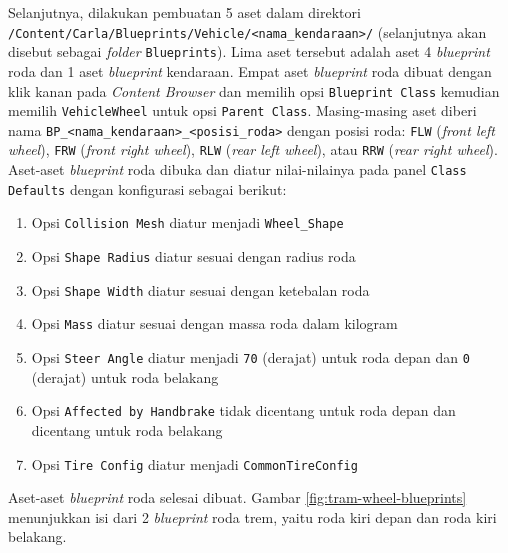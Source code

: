 Selanjutnya, dilakukan pembuatan 5 aset dalam direktori
\verb|/Content/Carla/Blueprints/Vehicle/<nama_kendaraan>/| (selanjutnya akan
disebut sebagai \textit{folder} \verb|Blueprints|). Lima aset tersebut adalah
aset 4 \textit{blueprint} roda dan 1 aset \textit{blueprint} kendaraan. Empat
aset \textit{blueprint} roda dibuat dengan klik kanan pada \textit{Content
Browser} dan memilih opsi \verb|Blueprint Class| kemudian memilih
\verb|VehicleWheel| untuk opsi \verb|Parent Class|. Masing-masing aset diberi
nama \verb|BP_<nama_kendaraan>_<posisi_roda>| dengan posisi roda: \verb|FLW|
(\textit{front left wheel}), \verb|FRW| (\textit{front right wheel}), \verb|RLW|
(\textit{rear left wheel}), atau \verb|RRW| (\textit{rear right wheel}).
Aset-aset \textit{blueprint} roda dibuka dan diatur nilai-nilainya pada panel
\verb|Class Defaults| dengan konfigurasi sebagai berikut:

\begin{enumerate}
    \item Opsi \verb|Collision Mesh| diatur menjadi \verb|Wheel_Shape|
    \item Opsi \verb|Shape Radius| diatur sesuai dengan radius roda
    \item Opsi \verb|Shape Width| diatur sesuai dengan ketebalan roda
    \item Opsi \verb|Mass| diatur sesuai dengan massa roda dalam kilogram
    \item Opsi \verb|Steer Angle| diatur menjadi \verb|70| (derajat) untuk roda
    depan dan \verb|0| (derajat) untuk roda belakang
    \item Opsi \verb|Affected by Handbrake| tidak dicentang untuk roda depan dan
    dicentang untuk roda belakang
    \item Opsi \verb|Tire Config| diatur menjadi \verb|CommonTireConfig|
\end{enumerate}

Aset-aset \textit{blueprint} roda selesai dibuat. Gambar
\ref{fig:tram-wheel-blueprints} menunjukkan isi dari 2 \textit{blueprint} roda
trem, yaitu roda kiri depan dan roda kiri belakang.

